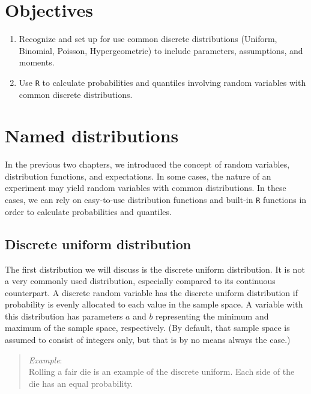 \documentclass[
  letterpaper,
  DIV=11,
  numbers=noendperiod]{scrreprt}
\begin{document}
\section{Objectives}\label{objectives-12}

\begin{enumerate}
\def\labelenumi{\arabic{enumi})}
\item
  Recognize and set up for use common discrete distributions (Uniform,
  Binomial, Poisson, Hypergeometric) to include parameters, assumptions,
  and moments.
\item
  Use \texttt{R} to calculate probabilities and quantiles involving
  random variables with common discrete distributions.
\end{enumerate}

\section{Named distributions}\label{named-distributions}

In the previous two chapters, we introduced the concept of random
variables, distribution functions, and expectations. In some cases, the
nature of an experiment may yield random variables with common
distributions. In these cases, we can rely on easy-to-use distribution
functions and built-in \texttt{R} functions in order to calculate
probabilities and quantiles.

\subsection{Discrete uniform
distribution}\label{discrete-uniform-distribution}

The first distribution we will discuss is the discrete uniform
distribution. It is not a very commonly used distribution, especially
compared to its continuous counterpart. A discrete random variable has
the discrete uniform distribution if probability is evenly allocated to
each value in the sample space. A variable with this distribution has
parameters \(a\) and \(b\) representing the minimum and maximum of the
sample space, respectively. (By default, that sample space is assumed to
consist of integers only, but that is by no means always the case.)

\begin{quote}
\emph{Example}:\\
Rolling a fair die is an example of the discrete uniform. Each side of
the die has an equal probability.
\end{quote}
\end{document}
